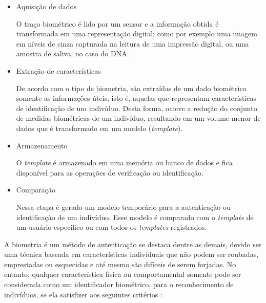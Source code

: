\begin{itemize}
    \item Aquisição de dados
    
    O traço biométrico é lido por um sensor e a informação obtida é transformada em uma representação digital; como por exemplo uma imagem em níveis de cinza capturada na leitura de uma impressão digital, ou uma amostra de saliva, no caso do DNA.
    
    \item Extração de características
    
   
    De acordo com o tipo de biometria, são extraídas de um dado biométrico somente as informações úteis, isto é, aquelas que representam características de identificação de um indivíduo. Desta forma, ocorre a redução do conjunto de medidas biométricas de um indivíduo, resultando em um volume menor de dados que é transformado em um modelo (\textit{template}).
    

    \item Armazenamento
    
    O \textit{template} é armazenado em uma memória ou banco de dados e fica disponível para as operações de verificação ou identificação.
    
    \item Comparação
    
    Nessa etapa é gerado um modelo temporário para a autenticação ou identificação de um indivíduo. Esse modelo é comparado com o 
    \textit{template} de um usuário específico ou com todos os \textit{templates} registrados. 
    
\end{itemize}


  A biometria é um método de autenticação se destaca dentre as demais, devido ser uma técnica baseada em características individuais que não podem ser roubadas, emprestadas ou esquecidas e até mesmo são difíceis de serem forjadas. No entanto, qualquer característica física ou comportamental somente pode ser considerada como um identificador biométrico, para o reconhecimento de indivíduos, se ela satisfizer aos seguintes critérios \cite{maltoni2009handbook}:

